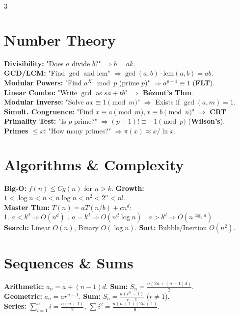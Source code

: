 \documentclass[10pt]{article}
\begin{document}
\begin{multicols}{3}
\section{Number Theory}
\textbf{Divisibility:} "Does $a$ divide $b$?" $\Rightarrow b=ak$. \\
\textbf{GCD/LCM:} "Find $\gcd$ and $\text{lcm}$" $\Rightarrow \gcd(a,b) \cdot \text{lcm}(a,b) = ab$. \\
\textbf{Modular Powers:} "Find $a^{X} \mod p$ (prime $p$)" $\Rightarrow a^{p-1} \equiv 1$ (\textbf{FLT}). \\
\textbf{Linear Combo:} "Write $\gcd$ as $sa+tb$" $\Rightarrow$ \textbf{B\'ezout's Thm}. \\
\textbf{Modular Inverse:} "Solve $ax \equiv 1 \pmod m$" $\Rightarrow$ Exists if $\gcd(a,m)=1$. \\
\textbf{Simult. Congruence:} "Find $x \equiv a \pmod m, x \equiv b \pmod n$" $\Rightarrow$ \textbf{CRT}. \\
\textbf{Primality Test:} "Is $p$ prime?" $\Rightarrow (p-1)! \equiv -1 \pmod p$ (\textbf{Wilson's}). \\
\textbf{Primes $\le x$:} "How many primes?" $\Rightarrow \pi(x) \approx x/\ln x$.

\section{Algorithms \& Complexity}
\textbf{Big-O:} $f(n) \le Cg(n)$ for $n > k$. \quad \textbf{Growth:} $1 < \log n < n < n \log n < n^2 < 2^n < n!$. \\
\textbf{Master Thm:} $T(n) = aT(n/b) + cn^d$: \\
1. $a < b^d \Rightarrow O(n^d)$ . $a = b^d \Rightarrow O(n^d \log n)$ . $a > b^d \Rightarrow O(n^{\log_b a})$ \\
\textbf{Search:} Linear $O(n)$, Binary $O(\log n)$. \quad \textbf{Sort:} Bubble/Inertion $O(n^2)$.

\section{Sequences \& Sums}
\textbf{Arithmetic:} $a_n = a + (n-1)d$. \textbf{Sum:} $S_n = \frac{n(2a+(n-1)d)}{2}$. \\
\textbf{Geometric:} $a_n = ar^{n-1}$. \textbf{Sum:} $S_n = \frac{a(r^n-1)}{r-1}$ ($r \neq 1$). \\
\textbf{Series:} $\sum_{i=1}^n i = \frac{n(n+1)}{2}$, $\sum i^2 = \frac{n(n+1)(2n+1)}{6}$.


\end{multicols}
\end{document}
